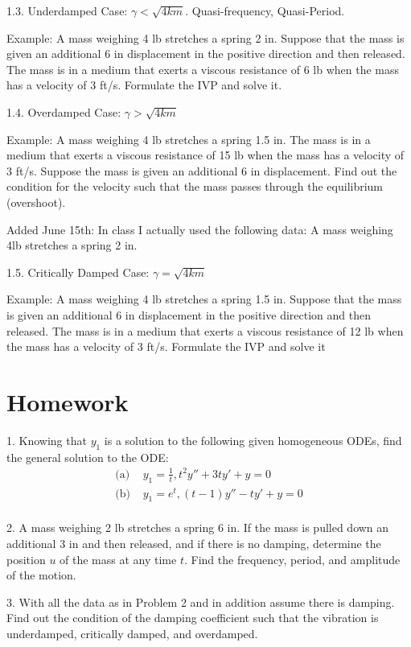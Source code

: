 \documentclass[11pt]{article}
\begin{document}
1.3. Underdamped Case: $\gamma<\sqrt{4km}$. Quasi-frequency, Quasi-Period. 

Example: A mass weighing 4 lb stretches a spring 2 in. Suppose that the mass is given an additional 6 in displacement in the positive direction and then released. The mass is in a medium that exerts a viscous resistance of 6 lb when the mass has a velocity of 3 ft/s. Formulate the IVP and solve it. 

1.4. Overdamped Case: $\gamma > \sqrt{4km}$

Example: A mass weighing 4 lb stretches a spring 1.5 in. The mass is in a medium that exerts a viscous resistance of 15 lb when the mass has a velocity of 3 ft/s. Suppose the mass is given an additional 6 in displacement. Find out the condition for the velocity such that the mass passes through the equilibrium (overshoot). 

Added June 15th: In class I actually used the following data: A mass weighing 4lb stretches a spring 2 in. 


1.5. Critically Damped Case: $\gamma = \sqrt{4km}$

Example: A mass weighing 4 lb stretches a spring 1.5 in. Suppose that the mass is given an additional 6 in displacement in the positive direction and then released. The mass is in a medium that exerts a viscous resistance of 12 lb when the mass has a velocity of 3 ft/s. Formulate the IVP and solve it


\newpage

\section*{Homework}

1. Knowing that $y_1$ is a solution to the following given homogeneous ODEs, find the general solution to the ODE:
$$
\begin{aligned}
\text{(a)  }& y_1 = \frac 1 t, t^2 y'' + 3t y' + y = 0\\
\text{(b)  }& y_1 = e^t, (t-1)y'' - ty' + y = 0\\
\end{aligned}
$$

2. A mass weighing 2 lb stretches a spring 6 in. If the mass is pulled down an additional 3 in
and then released, and if there is no damping, determine the position $u$ of the mass at any
time $t$. Find the frequency, period, and amplitude of the motion.

3. With all the data as in Problem 2 and in addition assume there is damping. Find out the condition of the damping coefficient such that the vibration is underdamped, critically damped, and overdamped. 
\end{document}
